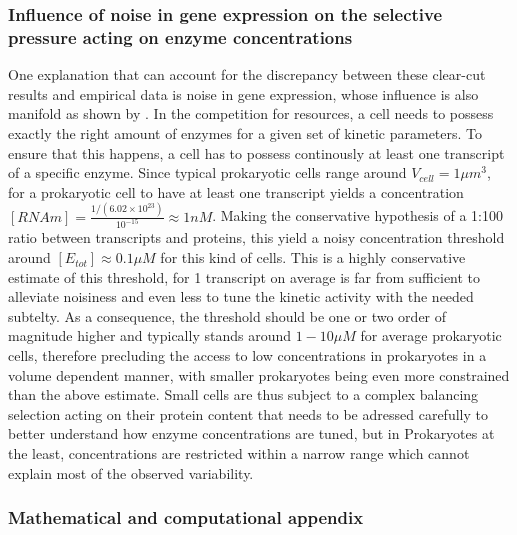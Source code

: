 \pagebreak

\subsubsection{{Influence of noise in gene expression on the selective pressure acting on enzyme concentrations}\label{sec:NGESEC}}

One explanation that can account for the discrepancy between these clear-cut results and empirical data is noise in gene expression, whose influence is also manifold as shown by \citep{Wang11}. In the competition for resources, a cell needs to possess exactly the right amount of enzymes for a given set of kinetic parameters. To ensure that this happens, a cell has to possess continously at least one transcript of a specific enzyme. Since typical prokaryotic cells range around $V_{cell}=1 \mu m^3$, for a prokaryotic cell to have at least one transcript yields a concentration $[RNAm]=\frac{1/(6.02\times10^{23})}{10^{-15}}\approx 1nM$. Making the conservative hypothesis of a 1:100 ratio between transcripts and proteins, this yield a noisy concentration threshold around $[E_{tot}] \approx 0.1 \mu M$ for this kind of cells. This is a highly conservative estimate of this threshold, for 1 transcript on average is far from sufficient to alleviate noisiness and even less to tune the kinetic activity with the needed subtelty. As a consequence, the threshold should be one or two order of magnitude higher and typically stands around $1-10\mu M$ for average prokaryotic cells, therefore precluding the access to low concentrations in prokaryotes in a volume dependent manner, with smaller prokaryotes being even more constrained than the above estimate. Small cells are thus subject to a complex balancing selection acting on their protein content that needs to be adressed carefully to better understand how enzyme concentrations are tuned, but in Prokaryotes at the least, concentrations are restricted within a narrow range which cannot explain most of the observed variability.%

\subsubsection{{Mathematical and computational appendix}\label{sec:App}}

